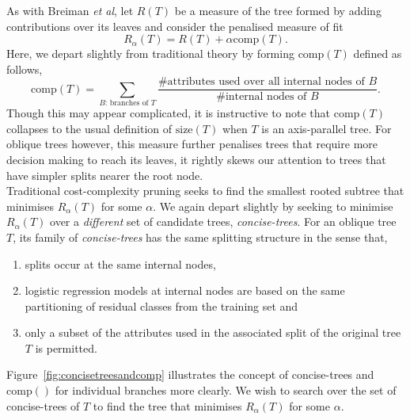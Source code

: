 As with Breiman \emph{et al}, let $R(T)$ be a measure of the tree formed by adding contributions over its leaves and consider the penalised measure of fit $$R_\alpha(T)=R(T)+\alpha \mbox{comp}(T).$$ Here, we depart slightly from traditional theory by forming $\mbox{comp}(T)$ defined as follows, $$\mbox{comp}(T)=\sum_{B\mbox{: branches of }T}\frac{\mbox{\# attributes used over all internal nodes of }B}{\mbox{\# internal nodes of }B}.$$ Though this may appear complicated, it is instructive to note that $\mbox{comp}(T)$ collapses to the usual definition of $\mbox{size}(T)$ when $T$ is an axis-parallel tree. For oblique trees however, this measure further penalises trees that require more decision making to reach its leaves, it rightly skews our attention to trees that have simpler splits nearer the root node.\\

Traditional cost-complexity pruning seeks to find the smallest rooted subtree that minimises $R_\alpha(T)$ for some $\alpha$. We again depart slightly by seeking to minimise $R_\alpha(T)$ over a \emph{different} set of candidate trees, \emph{concise-trees}. For an oblique tree $T$, its family of \emph{concise-trees} has the same splitting structure in the sense that,
\begin{enumerate}
\item splits occur at the same internal nodes,
\item logistic regression models at internal nodes are based on the same partitioning of residual classes from the training set and
\item only a subset of the attributes used in the associated split of the original tree $T$ is permitted.
\end{enumerate}
Figure~\ref{fig:concisetreesandcomp} illustrates the concept of concise-trees and $\mbox{comp}()$ for individual branches more clearly. We wish to search over the set of concise-trees of $T$ to find the tree that minimises $R_\alpha(T)$ for some $\alpha$. \\

